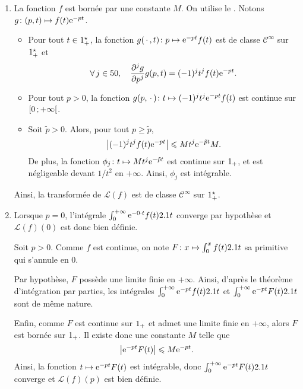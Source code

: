 \begin{demo}
\begin{enumerate}
\item La fonction $f$ est bornée par une constante $M$. On utilise le . Notons $\fonctionligne[g]{(p, t)}{f(t) \e^{-pt}}$.
\begin{itemize}
\item Pour tout $t \in \Rpe$, la fonction $\fonctionligne[g(\,\cdot\,, t)]{p}{\e^{-p t} f(t)}$ est de classe $\mathscr{C}^\infty$ sur $\Rpe$ et
\[
\forall j \in \N,\quad \frac{\partial^j g}{\partial p^j} g(p, t) = (-1)^j t^j f(t) \e^{-pt}.
\]

\item Pour tout $p > 0$, la fonction $\fonctionligne[g(p,\,\cdot\,)]{t}{(-1)^j t^j \e^{-p t} f(t)}$ est continue sur $\interfo{0}{+\infty}$.

\item Soit $\tilde{p} > 0$. Alors, pour tout $p \geqslant \tilde{p}$,
\[
\abs{(-1)^j t^j f(t) \e^{-p t}} \leqslant M t^j \e^{- \tilde{p} t} M.
\]
De plus, la fonction $\fonctionligne[\phi_j]{t}{M t^j \e^{-\tilde{p} t}}$ est continue sur $\Rp$, et est négligeable devant $1/t^2$ en $+\infty$. Ainsi, $\phi_j$ est intégrable.
\end{itemize}
Ainsi, la transformée de  $\mathscr{L}(f)$ est de classe $\mathscr{C}^\infty$ sur $\Rpe$.

\item Lorsque $p = 0$, l'intégrale $\int_0^{+\infty} \e^{-0\cdot t} f(t) \d t$ converge par hypothèse et $\mathscr{L}(f)(0)$ est donc bien définie.

\medskip

Soit $p > 0$. Comme $f$ est continue, on note $\fonctionligne[F]{x}{\int_0^x f(t) \d t}$ sa primitive qui s'annule en $0$.

Par hypothèse, $F$ possède une limite finie en $+\infty$. Ainsi, d'après le théorème d'intégration par parties, les intégrales $\int_0^{+\infty} \e^{-p t} f(t) \d t$ et $\int_0^{+\infty} \e^{-p t} F(t) \d t$ sont de même nature.

Enfin, comme $F$ est continue sur $\Rp$ et admet une limite finie en $+\infty$, alors $F$ est bornée sur $\Rp$. Il existe donc une constante $M$ telle que
\[
\module{\e^{-p t} F(t)} \leqslant M \e^{-p t}.
\]
Ainsi, la fonction $t \mapsto \e^{-p t} F(t)$ est intégrable, donc $\int_0^{+\infty} \e^{-p t} F(t) \d t$ converge et $\mathscr{L}(f)(p)$ est bien définie.


\end{enumerate}
\end{demo}
